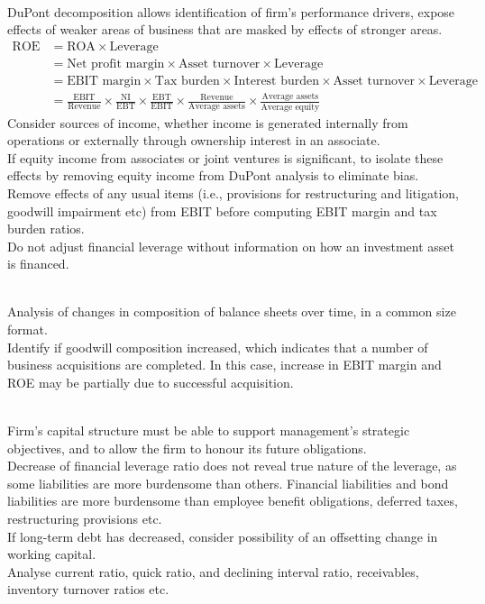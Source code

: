 \begin{remark}  \\
DuPont decomposition allows identification of firm's performance drivers, expose effects of weaker areas of business that are masked by effects of stronger areas.
\begin{align}
\text{ROE} &= \text{ROA} \times \text{Leverage} \nonumber \\
&= \text{Net profit margin} \times \text{Asset turnover} \times \text{Leverage} \nonumber \\
&= \text{EBIT margin} \times \text{Tax burden} \times \text{Interest burden} \times \text{Asset turnover} \times \text{Leverage} \nonumber \\
&= \frac{\text{EBIT}}{\text{Revenue}} \times \frac{\text{NI}}{\text{EBT}} \times \frac{\text{EBT}}{\text{EBIT}} \times \frac{\text{Revenue}}{\text{Average assets}} \times \frac{\text{Average assets}}{\text{Average equity}} \nonumber
\end{align}
Consider sources of income, whether income is generated internally from operations or externally through ownership interest in an associate.\\
If equity income from associates or joint ventures is significant, to isolate these effects by removing equity income from DuPont analysis to eliminate bias.\\
Remove effects of any usual items (i.e., provisions for restructuring and litigation, goodwill impairment etc) from EBIT before computing EBIT margin and tax burden ratios.\\
Do not adjust financial leverage without information on how an investment asset is financed.
\end{remark}

\begin{remark} \\
Analysis of changes in composition of balance sheets over time, in a common size format.\\
Identify if goodwill composition increased, which indicates that a number of business acquisitions are completed. In this case, increase in EBIT margin and ROE may be partially due to successful acquisition.
\end{remark}

\begin{remark} \\
Firm's capital structure must be able to support management's strategic objectives, and to allow the firm to honour its future obligations.\\
Decrease of financial leverage ratio does not reveal true nature of the leverage, as some liabilities are more burdensome than others. Financial liabilities and bond liabilities are more burdensome than employee benefit obligations, deferred taxes, restructuring provisions etc.\\
If long-term debt has decreased, consider possibility of an offsetting change in working capital.\\
Analyse current ratio, quick ratio, and declining interval ratio, receivables, inventory turnover ratios etc.
\end{remark}

